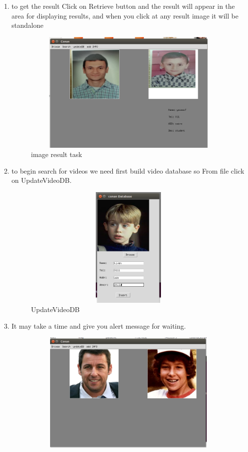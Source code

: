 \documentclass[pdftex,10pt,a4paper,oneside]{article}
\begin{document}
\begin{enumerate}
\pagebreak
		\item 	to get the result Click on Retrieve button and the result will appear in the area for displaying results, and when you click at any result image it will be  standalone
		\begin{figure}[H]
			\centering
			\includegraphics[width=120mm,height=60mm]{fig/14.png}
			\caption{image result task }
			\label{image result task}
		\end{figure}


	
	\item to begin search for videos we need first build video database
	so From file click on UpdateVideoDB.
		
		 
		\begin{figure}[H]
			\centering
			\includegraphics[width=120mm,height=60mm]{fig/9.png}
			\caption{UpdateVideoDB }
			\label{UpdateVideoDB}
		\end{figure}
	
	\pagebreak
		\item 	It may take a time and give you alert message for waiting.
	\begin{figure}[H]
		\centering
		\includegraphics[width=120mm,height=60mm]{fig/12.png}
	\end{figure}
	

\end{enumerate}
\end{document}
